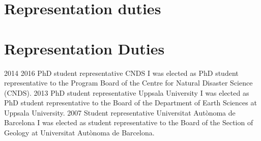 \ifswedish
    \section{Representation duties}
\else
    \section{Representation Duties}
    \position
        {2014 \textemdash{} 2016}
        {PhD student representative}
        {CNDS}
        {I was elected as PhD student representative to the Program Board of the Centre for Natural Disaster Science (CNDS).}
    \position
        {2013}
        {PhD student representative}
        {Uppsala University}
        {I was elected as PhD student representative to the Board of the Department of Earth Sciences at Uppsala University.}
    \position
        {2007}
        {Student representative}
        {Universitat Autònoma de Barcelona}
        {I was elected as student representative to the Board of the Section of Geology at Universitat Autònoma de Barcelona.}
\fi